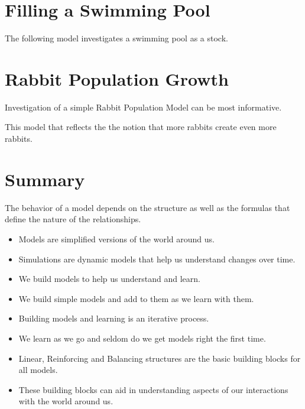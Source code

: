 \documentclass[]{memoir}
\begin{document}
\section{Filling a Swimming Pool}

\FloatBarrier 

\begin{model}[frametitle={Model: Filling a Swimming Pool}] 

 The following model investigates a swimming pool as a stock.




 \end{model}

\section{Rabbit Population Growth}

Investigation of a simple Rabbit Population Model can be most
informative.

\FloatBarrier 

\begin{model}[frametitle={Model: Rabbit Population Growth}] 

 This model that reflects the the notion that more rabbits create even more rabbits.




 \end{model}

\section{Summary}

\FloatBarrier 

\begin{model}[frametitle={Model: Similar Structures / Different Behavior}] 

 The behavior of a model depends on the structure as well as the formulas that define the nature of the relationships.




 \end{model}

\begin{itemize}
\itemsep1pt\parskip0pt
\item
  Models are simplified versions of the world around us.
\item
  Simulations are dynamic models that help us understand changes over
  time.
\item
  We build models to help us understand and learn.
\item
  We build simple models and add to them as we learn with them.
\item
  Building models and learning is an iterative process.
\item
  We learn as we go and seldom do we get models right the first time.
\item
  Linear, Reinforcing and Balancing structures are the basic building
  blocks for all models.
\item
  These building blocks can aid in understanding aspects of our
  interactions with the world around us.
\end{itemize}
\end{document}
